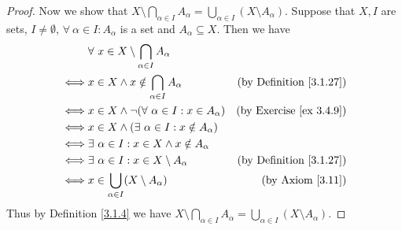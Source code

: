 \begin{proof}
    Now we show that \(X \setminus \bigcap_{\alpha \in I} A_{\alpha} = \bigcup_{\alpha \in I} (X \setminus A_{\alpha})\).
    Suppose that \(X, I\) are sets, \(I \neq \emptyset\), \(\forall\ \alpha \in I : A_{\alpha}\) is a set and \(A_{\alpha} \subseteq X\).
    Then we have
    \begin{align*}
             & \forall\ x \in X \setminus \bigcap_{\alpha \in I} A_{\alpha}                                        \\
        \iff & x \in X \land x \notin \bigcap_{\alpha \in I} A_{\alpha}      & \text{(by Definition \ref{3.1.27})} \\
        \iff & x \in X \land \lnot(\forall\ \alpha \in I : x \in A_{\alpha}) & \text{(by Exercise \ref{ex 3.4.9})} \\
        \iff & x \in X \land (\exists\ \alpha \in I : x \notin A_{\alpha})                                         \\
        \iff & \exists\ \alpha \in I : x \in X \land x \notin A_{\alpha}                                           \\
        \iff & \exists\ \alpha \in I : x \in X \setminus A_{\alpha}          & \text{(by Definition \ref{3.1.27})} \\
        \iff & x \in \bigcup_{\alpha \in I} (X \setminus A_{\alpha})         & \text{(by Axiom \ref{3.11})}        \\
    \end{align*}
    Thus by Definition \ref{3.1.4} we have \(X \setminus \bigcap_{\alpha \in I} A_{\alpha} = \bigcup_{\alpha \in I} (X \setminus A_{\alpha})\).
\end{proof}
